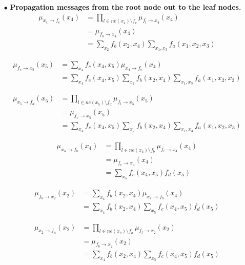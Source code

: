 \documentclass[12pt, fullpage,letterpaper]{article}
\begin{document}
\begin{enumerate}
{\begin{itemize}
\begin{align}
\mu_{f_b\rightarrow x_4}(x_4) & = \sum_{x_2}f_b(x_2,x_4)\mu_{x_2\rightarrow f_b}(x_2)\nonumber \\
& = \sum_{x_2}f_b(x_2,x_4)\sum_{x_1,x_3}f_a(x_1,x_2,x_3)
\end{align}

\item[$\bullet$]{\bf Propagation messages from the root node out to the leaf nodes.}
\begin{align}
\mu_{x_4\rightarrow f_c}(x_4) 
&=  \prod_{l\in ne(x_4)\setminus f_c}\mu_{f_l\rightarrow x_4}(x_4)\nonumber \\
& = \mu_{f_b\rightarrow x_4}(x_4)\\
& = \sum_{x_2}f_b(x_2,x_4)\sum_{x_1,x_3}f_a(x_1,x_2,x_3)
\end{align}

\begin{align}
\mu_{f_c\rightarrow x_5}(x_5) & =\sum_{x_4}f_c(x_4,x_5)\mu_{x_4\rightarrow f_c}(x_4)\nonumber \\
& = \sum_{x_4}f_c(x_4,x_5)\sum_{x_2}f_b(x_2,x_4)\sum_{x_1,x_3}f_a(x_1,x_2,x_3)
\end{align}

\begin{align}
\mu_{x_5\rightarrow f_d}(x_5) 
&=  \prod_{l\in ne(x_5)\setminus f_d}\mu_{f_l\rightarrow x_5}(x_5)\nonumber \\
& = \mu_{f_c\rightarrow x_5}(x_5)\\
& = \sum_{x_4}f_c(x_4,x_5)\sum_{x_2}f_b(x_2,x_4)\sum_{x_1,x_3}f_a(x_1,x_2,x_3)\nonumber
\end{align}


\begin{align}
\mu_{x_4\rightarrow f_b}(x_4) 
&=  \prod_{l\in ne(x_4)\setminus f_b}\mu_{f_l\rightarrow x_4}(x_4)\nonumber \\
& = \mu_{f_c\rightarrow x_4}(x_4)\\
& = \sum_{x_5}f_c(x_4,x_5)f_d(x_5)\nonumber
\end{align}

\begin{align}
\mu_{f_b\rightarrow x_2}(x_2) & =\sum_{x_4}f_b(x_2,x_4)\mu_{x_4\rightarrow f_b}(x_4)\nonumber \\
& = \sum_{x_4}f_b(x_2,x_4)\sum_{x_5}f_c(x_4,x_5)f_d(x_5)
\end{align}


\begin{align}
\mu_{x_2\rightarrow f_a}(x_2) 
&=  \prod_{l\in ne(x_2)\setminus f_a}\mu_{f_l\rightarrow x_2}(x_2)\nonumber \\
& = \mu_{f_b\rightarrow x_2}(x_2)\\
& =  \sum_{x_4}f_b(x_2,x_4)\sum_{x_5}f_c(x_4,x_5)f_d(x_5)\nonumber
\end{align}



\end{itemize}}
\end{enumerate}
\end{document}
